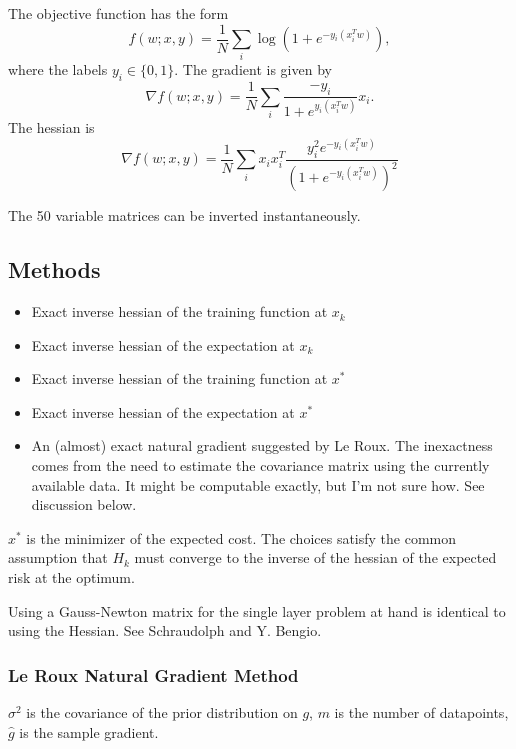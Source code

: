 \documentclass[12pt]{article}
\begin{document}
The objective function has the form 
\begin{equation}
	f(w;x,y) = \frac{1}{N} \sum_i \log \left( 1 + e^{-y_i(x_i^T w)}\right),
\end{equation}
where the labels $y_i \in \{0,1\}$.
The gradient is given by
\begin{equation}
	\nabla f(w;x,y) = \frac{1}{N} \sum_i   \frac{-y_i}{1 + e^{y_i (x_i^T w)}}x_i .
\end{equation}
The hessian is 
\begin{equation}
	\nabla f(w;x,y) = \frac{1}{N} \sum_i x_i x_i^T \frac{y_i^2 e^{-y_i(x_i^T w)}}{(1 + e^{-y_i(x_i^T w)})^2}
\end{equation}




The 50 variable matrices can be inverted instantaneously. 

\subsection{Methods}

\begin{itemize}
	\item Exact inverse hessian of the training function at $x_k$
	\item Exact inverse hessian of the expectation at $x_k$
	\item Exact inverse hessian of the training function at $x^*$
	\item Exact inverse hessian of the expectation at $x^*$
	\item An (almost) exact natural gradient suggested by Le Roux. The inexactness comes from the need to estimate the covariance matrix using the currently available data. It might be computable exactly, but I'm not sure how. See discussion below.
\end{itemize}
$x^*$ is the minimizer of the expected cost. The choices satisfy the common assumption that $H_k$ must converge to the inverse of the hessian of the expected risk at the optimum. 

Using a Gauss-Newton matrix for the single layer problem at hand is identical to using the Hessian. See Schraudolph and Y. Bengio.
  
\subsubsection{Le Roux Natural Gradient Method}
 
$\sigma^2$ is the covariance of the prior distribution on $g$, $m$ is the number of datapoints, $\hat{g}$ is the sample gradient. 
\end{document}

